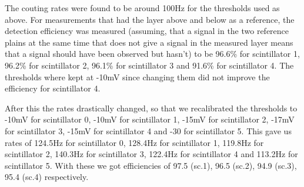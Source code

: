 The couting rates were found to be around 100Hz for the thresholds used as above. For measurements that had the layer above and below as a reference, the detection efficiency was measured (assuming, that a signal in the two reference plains at the same time that does not give a signal in the measured layer means that a signal should have been observed but hasn't) to be 96.6\% for scintillator 1, 96.2\% for scintillator 2, 96.1\% for scintillator 3 and 91.6\% for scintillator 4. The thresholds where kept at -10mV since changing them did not improve the efficiency for scintillator 4. 

After this the rates drastically changed, so that we recalibrated the thresholds to -10mV for scintillator 0, -10mV for scintillator 1, -15mV for scintillator 2, -17mV for scintillator 3, -15mV for scintillator 4 and -30 for scintillator 5.
This gave us rates of 124.5Hz for scintillator 0, 128.4Hz for scintillator 1, 119.8Hz for scintillator 2, 140.3Hz for scintillator 3, 122.4Hz for scintillator 4 and 113.2Hz for scintillator 5. With these we got efficiencies of 97.5 (sc.1), 96.5 (sc.2), 94.9 (sc.3), 95.4 (sc.4) respectively. 